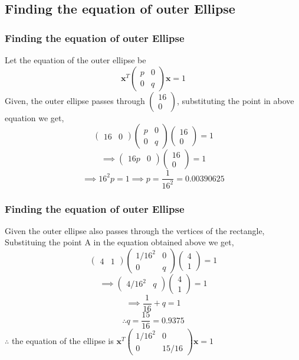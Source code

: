 \documentclass{beamer}
\theoremstyle{remark}
\let\vec\mathbf
\numberwithin{equation}{section}
\begin{document}
\subsection{Finding the equation of outer Ellipse}
\begin{frame}[t]
\frametitle{Finding the equation of outer Ellipse}
Let the equation of the outer ellipse be
$$\vec{x}^T \begin{pmatrix}
p & 0\\
0 & q
\end{pmatrix} \vec{x} = 1$$
Given, the outer ellipse passes through $\begin{pmatrix}
16\\
0
\end{pmatrix}$, substituting the point in above equation we get,\\
$$\begin{pmatrix}
16 & 0
\end{pmatrix}\begin{pmatrix}
p & 0\\
0 & q
\end{pmatrix}\begin{pmatrix}
16\\
0
\end{pmatrix}= 1$$
$$\implies\begin{pmatrix}
16p&0
\end{pmatrix}\begin{pmatrix}
16\\
0
\end{pmatrix}=1$$
$$\implies 16^2p = 1 \implies p = \displaystyle{\frac{1}{16^2}=0.00390625} $$
\end{frame}

\begin{frame}[t]
\frametitle{Finding the equation of outer Ellipse}
Given the outer ellipse also passes through the vertices of the rectangle,
Substituing the point A in the equation obtained above we get,
$$\begin{pmatrix}
4 & 1
\end{pmatrix} \begin{pmatrix}
1/16^2 & 0\\
0 & q
\end{pmatrix}\begin{pmatrix}
4\\
1
\end{pmatrix}=1$$
$$\implies \begin{pmatrix}
4/16^2 & q
\end{pmatrix}\begin{pmatrix}
4\\
1
\end{pmatrix}=1$$
$$\implies \displaystyle{\frac{1}{16}}+q=1$$
$$\therefore q = \displaystyle{\frac{15}{16}=0.9375}$$
$\therefore$ the equation of the ellipse is $\vec{x}^T\begin{pmatrix}
1/16^2 & 0\\
0 & 15/16
\end{pmatrix}\vec{x}=1$
\end{frame}
\end{document}
